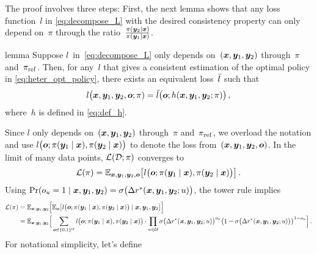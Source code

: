 \begin{proofEnd}
    The proof involves three steps: First, the next lemma shows that any loss function~$l$ in \cref{eq:decompose_L} with the desired consistency property can only depend on~$\pi$ through the ratio~$\frac{\pi({\bm{y}}_2 \mid {\bm{x}})}{\pi({\bm{y}}_1 \mid {\bm{x}})}$.
    
    \begin{theoremEnd}[restate]{lemma}
    \label{lem:l_tilde}
    Suppose $l$~in~\cref{eq:decompose_L} only depends on~$({\bm{x}}, {\bm{y}}_1, {\bm{y}}_2)$ through~$\pi$ and~$\pi_{\rm ref}$. Then, for any~$l$ that gives a consistent estimation of the optimal policy in \cref{eq:heter_opt_policy}, there exists an equivalent loss~${\tilde{l}}$ such that 
    \begin{equation*}
        l\big({\bm{x}}, {\bm{y}}_1, {\bm{y}}_2, {\bm{o}}; \pi) = {\tilde{l}}\big({\bm{o}}; h({\bm{x}}, {\bm{y}}_1, {\bm{y}}_2; \pi)\big)
        \,,
    \end{equation*}
    where~$h$ is defined in \cref{eq:def_h}.
    \end{theoremEnd}
    \begin{proofEnd}
        Since $l$ only depends on~$({\bm{x}}, {\bm{y}}_1, {\bm{y}}_2)$ through~$\pi$ and~$\pi_{\rm ref}$, we overload the notation and use $l\big({\bm{o}}; \pi({\bm{y}}_1 \mid {\bm{x}}), \pi({\bm{y}}_2 \mid {\bm{x}})\big)$ to denote the loss from~$({\bm{x}}, {\bm{y}}_1, {\bm{y}}_2, {\bm{o}})$. In the limit of many data points, ${\mathcal{L}}({\mathcal{D}}; \pi)$ converges to
        \begin{equation*}
            {\mathcal{L}}(\pi) = \mathbb{E}_{{\bm{x}}, {\bm{y}}_1, {\bm{y}}_2, {\bm{o}}}\big[l\big({\bm{o}}; \pi({\bm{y}}_1 \mid {\bm{x}}), \pi({\bm{y}}_2 \mid {\bm{x}})\big)\big]
            \,.
        \end{equation*}
        Using $\Pr(o_u = 1 \mid {\bm{x}}, {\bm{y}}_1, {\bm{y}}_2) = \sigma\big(\Delta r^*({\bm{x}}, {\bm{y}}_1, {\bm{y}}_2; u)\big)$, the tower rule implies
        \begin{align*}
            {\mathcal{L}}(\pi) &= \mathbb{E}_{{\bm{x}}, {\bm{y}}_1, {\bm{y}}_2}\Big[\mathbb{E}_{{\bm{o}}}\big[l\big({\bm{o}}; \pi({\bm{y}}_1 \mid {\bm{x}}), \pi({\bm{y}}_2 \mid {\bm{x}})\big) \mid {\bm{x}}, {\bm{y}}_1, {\bm{y}}_2\big]\Big] \\
            &= \mathbb{E}_{{\bm{x}}, {\bm{y}}_1, {\bm{y}}_2}\Big[
            \sum_{{\bm{o}} \in \{0, 1\}^{{\mathcal{U}}}}
            l\big({\bm{o}}; \pi({\bm{y}}_1 \mid {\bm{x}}), \pi({\bm{y}}_2 \mid {\bm{x}})\big) \cdot
            \prod_{u \in {\mathcal{U}}} \sigma\big(\Delta r^*({\bm{x}}, {\bm{y}}_1, {\bm{y}}_2; u)\big)^{o_u} \big(1 - \sigma\big(\Delta r^*({\bm{x}}, {\bm{y}}_1, {\bm{y}}_2; u)\big)\big)^{1 - o_u}
            \Big]
            \,.
        \end{align*}
        For notational simplicity, let's define
        \begin{align*}

\end{align*}
\end{proofEnd}
\end{proofEnd}
